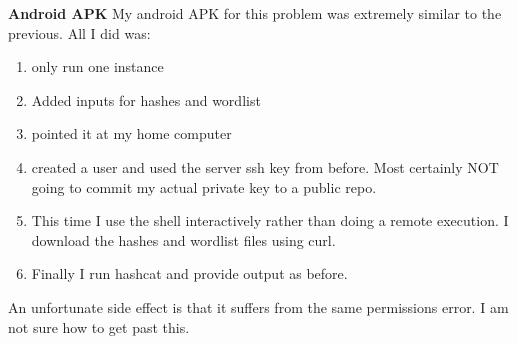 \documentclass{article}
\begin{document}
\textbf{Android APK}
My android APK for this problem was extremely similar to the previous. All I did was:
\begin{enumerate}
\item only run one instance
\item Added inputs for hashes and wordlist
\item pointed it at my home computer
\item created a user and used the server ssh key from before. Most certainly NOT going to commit my actual private key to a public repo.
\item This time I use the shell interactively rather than doing a remote execution. I download the hashes and wordlist files using curl.
\item Finally I run hashcat and provide output as before.
\end{enumerate}
An unfortunate side effect is that it suffers from the same permissions error. I am not sure how to get past this.
\end{document}
